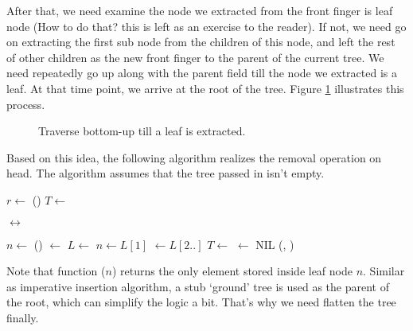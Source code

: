 \documentclass[UTF8]{article}
\begin{document}
After that, we need examine the node we extracted from the front finger is leaf node (How to do
that? this is left as an exercise to the reader). If not, we need go on extracting the first
sub node from the children of this node, and left the rest of other children as the new
front finger to the parent of the current tree. We need repeatedly go up along with the
parent field till the node we extracted is a leaf. At that time point, we arrive at the
root of the tree. Figure \ref{fig:ftr-illed-extract} illustrates this process.

\begin{figure}[htbp]
  \centering
  \caption{Traverse bottom-up till a leaf is extracted.} \label{fig:ftr-illed-extract}
\end{figure}

Based on this idea, the following algorithm realizes the removal operation on head. The
algorithm assumes that the tree passed in isn't empty.

\begin{algorithmic}
  \State $r \gets$ ()
  \State {}
    \State $T \gets$ 
  \EndWhile

    \State {}  $\leftrightarrow$ 
  \EndIf

  \State $n \gets $ ()
  \State {} $\gets$ 
  \Repeat
    \State $L \gets$  
    \State $n \gets L[1]$ 
    \State {} $\gets L[2..]$ 
    \State $T \gets $ 
      \State {} $\gets$ NIL
    \EndIf
  \State \Return (, )
\EndFunction
\end{algorithmic}

Note that function ($n$) returns the only element stored inside leaf node $n$.
Similar as imperative insertion algorithm, a stub `ground' tree is used as the parent of
the root, which can simplify the logic a bit. That's why we need flatten the tree finally.
\end{document}
